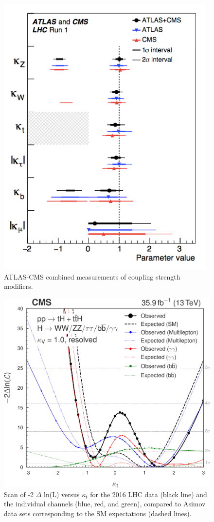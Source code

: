 \documentclass[final,3p]{CSP}
\begin{document}
  \begin{figure}[H]
    \centering
    \includegraphics[scale=0.4]{./couplings.png}
    \caption{ATLAS-CMS combined measurements of coupling strength modifiers.}
    \label{figureKappas}
  \end{figure}
  
  \begin{figure}[H]
    \centering
    \includegraphics[width=0.4 \columnwidth]{./cms13.png}
    \caption{Scan of -2 $\Delta$ ln(L) versus $\kappa_t$ for the 2016 LHC data (black line) and the individual channels (blue, red, and green), compared to Asimov data sets corresponding to the SM expectations (dashed lines).}
    \label{figureKt}
  \end{figure}
  
\end{document}

